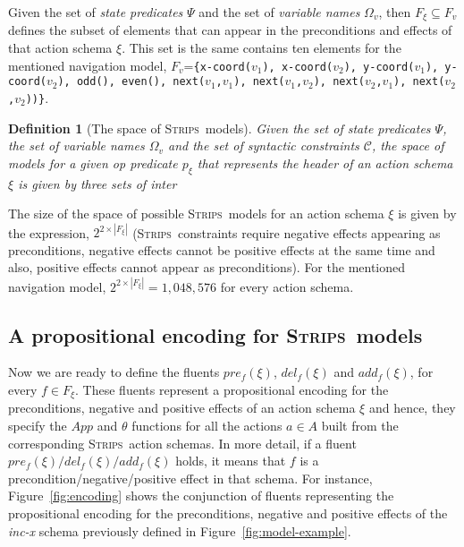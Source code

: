 \documentclass[letterpaper]{article} %
\newcommand{\strips}{\textsc{Strips}}     %
\newtheorem{definition}[theorem]{Definition}
\begin{document}
Given the set of {\em state predicates} $\Psi$ and the set of {\em variable names} $\Omega_v$, then $F_{\xi}\subseteq F_v$ defines the subset of elements that can appear in the preconditions and effects of that action schema $\xi$. This set is the same contains ten elements for the mentioned navigation model, $F_v$={\small\tt\{x-coord($v_1$), x-coord($v_2$), y-coord($v_1$), y-coord($v_2$), odd(), even(), next($v_1$,$v_1$), next($v_1$,$v_2$), next($v_2$,$v_1$), next($v_2$,$v_2$))\}}.



\begin{definition}[The space of \strips\ models]
Given the set of {\em state predicates} $\Psi$, the set of {\em variable names} $\Omega_v$ and the set of {\em syntactic constraints} ${\mathcal C}$, the space of models for a given op predicate $p_\xi$ that represents the header of an action schema $\xi$ is given by three sets of inter
\end{definition}

The size of the space of possible \strips\ models for an action schema $\xi$ is given by the expression, $2^{2\times|F_{\xi}|}$ (\strips\ constraints require negative effects appearing as preconditions, negative effects cannot be positive effects at the same time and also, positive effects cannot appear as preconditions). For the mentioned navigation model, $2^{2\times|F_{\xi}|}=1,048,576$ for every action schema.





\subsection{A propositional encoding for \strips\ models}
Now we are ready to define the fluents $pre_f(\xi)$, $del_f(\xi)$ and $add_f(\xi)$, for every $f\in F_{\xi}$. These fluents represent a propositional encoding for the preconditions, negative and positive effects of an action schema $\xi$ and hence, they specify the $App$ and $\theta$ functions for all the actions $a\in A$ built from the corresponding \strips\ action schemas. In more detail, if a fluent $pre_f(\xi)/del_f(\xi)/add_f(\xi)$ holds, it means that $f$ is a precondition/negative/positive effect in that schema. For instance, Figure~\ref{fig:encoding} shows the conjunction of fluents representing the propositional encoding for the preconditions, negative and positive effects of the {\em inc-x} schema previously defined in Figure~\ref{fig:model-example}. 
\end{document}
